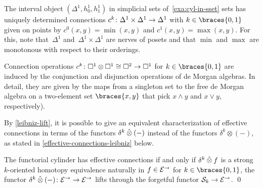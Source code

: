 \documentclass[reqno,10pt,a4paper,oneside,draft]{amsart}
\begin{document}
\begin{example}
The interval object $(\Delta^1, h_0^1, h_1^1)$ in simplicial sets of~\cref{exa:cyl-in-sset} sets has uniquely determined connections $c^k \colon \Delta^1 \times \Delta^1 \to \Delta^1$ with $k \in \braces{0, 1}$ given on points by $c^0(x, y) = \min(x, y)$ and $c^1(x, y) = \max(x, y)$.
For this, note that~$\Delta^1$ and~$\Delta^1 \times \Delta^1$ are nerves of posets and that $\min$ and $\max$ are monotonous with respect to their orderings.
\end{example}

\begin{example}
Connection operations $c^k \colon \Box^1 \otimes \Box^1 \cong \Box^2 \to \Box^1$ for $k \in \braces{0, 1}$ are induced by the conjunction and disjunction operations of de Morgan algebras.
In detail, they are given by the maps from a singleton set to the free de Morgan algebra on a two-element set $\braces{x, y}$ that pick $x \wedge y$ and $x \vee y$, respectively).
\end{example}




By \cref{leibniz-lift}, it is possible to give an equivalent characterization of effective connections in terms of the functors $\delta^k \mathbin{\hat{\otimes}} (-)$ instead of the functors $\delta^k \otimes (-)$, as stated in \cref{effective-connections-leibniz} below.

\begin{corollary} \label{effective-connections-leibniz}
The functorial cylinder has effective connections if and only if $\delta^k \mathbin{\hat{\otimes}} f$ is a strong $k$-oriented homotopy equivalence naturally in $f \in \mathcal{E}^\to$ for $k \in \braces{0, 1}$, \ie the functor $\delta^k \mathbin{\hat{\otimes}} (-) \colon \mathcal{E}^\to \to \mathcal{E}^\to$ lifts through the forgetful functor $\mathcal{S}_k \to \mathcal{E}^\to$.
\qed
\end{corollary}
\end{document}
